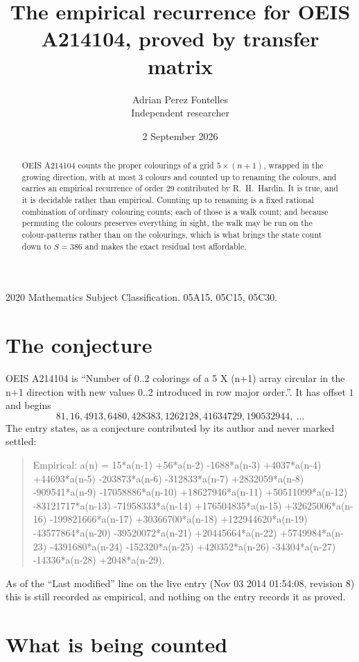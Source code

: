 \documentclass[11pt,a4paper]{article}
\title{The empirical recurrence for OEIS A214104, proved by transfer matrix}
\author{Adrian Perez Fontelles\\ \small Independent researcher}
\date{2 September 2026}
\theoremstyle{plain}
\theoremstyle{definition}
\begin{document}
\maketitle

\begin{abstract}
OEIS A214104 counts the proper colourings of a grid $5\times(n+1)$, wrapped in the growing direction, with at most $3$ colours and
counted up to renaming the colours, and carries an empirical recurrence of order $29$
contributed by R.~H.~Hardin. It is true, and it is decidable rather than empirical. Counting
up to renaming is a fixed rational combination of ordinary colouring counts; each of those is
a walk count; and because permuting the colours preserves everything in sight, the walk may be
run on the colour-patterns rather than on the colourings, which is what brings the state count
down to $S=386$ and makes the exact residual test affordable.
\end{abstract}

\noindent\small 2020 Mathematics Subject Classification. 05A15, 05C15, 05C30.\normalsize

\section{The conjecture}

OEIS A214104 is ``Number of 0..2 colorings of a 5 X (n+1) array circular in the n+1 direction with new values 0..2 introduced in row major order.''. It has offset $1$ and begins
\[
81, 16, 4913, 6480, 428383, 1262128, 41634729, 190532944,\ \dots
\]
The entry states, as a conjecture contributed by its author and never marked settled:
\begin{quote}
Empirical: a(n) = 15*a(n-1) +56*a(n-2) -1688*a(n-3) +4037*a(n-4) +44693*a(n-5) -203873*a(n-6) -312833*a(n-7) +2832059*a(n-8) -909541*a(n-9) -17058886*a(n-10) +18627946*a(n-11) +50511099*a(n-12) -83121717*a(n-13) -71958333*a(n-14) +176504835*a(n-15) +32625006*a(n-16) -199821666*a(n-17) +30366700*a(n-18) +122944620*a(n-19) -43577864*a(n-20) -39520072*a(n-21) +20445664*a(n-22) +5749984*a(n-23) -4391680*a(n-24) -152320*a(n-25) +420352*a(n-26) -34304*a(n-27) -14336*a(n-28) +2048*a(n-29).
\end{quote}
As of the ``Last modified'' line on the live entry (Nov 03 2014 01:54:08, revision 8) this is still
recorded as empirical, and nothing on the entry records it as proved.

\section{What is being counted}
\end{document}
